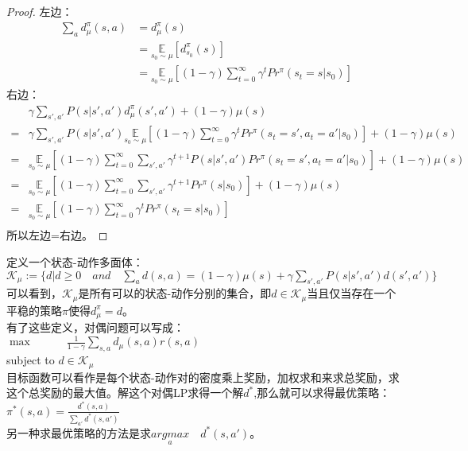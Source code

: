\begin{proof}
    左边：\\
    \begin{equation}
        \begin{aligned}
            \underset{a}{\sum}d^{\pi}_{\mu}(s,a)&=d^{\pi}_{\mu}(s)\\
           &=\underset{s_0\sim \mu}{\mathbb{E}}[d^{\pi}_{s_0}(s)]\\
           &=\underset{s_0\sim \mu}{\mathbb{E}}[(1-\gamma)\sum_{t=0}^{\infty}\gamma^tPr^{\pi}(s_t=s|s_0)]
        \end{aligned}
    \end{equation}
    右边：
    \begin{equation}
        \begin{aligned}
            &\gamma\underset{s',a'}{\sum}P(s|s',a')d^{\pi}_{\mu}(s',a')+(1-\gamma)\mu(s)\\
            =&\gamma\underset{s',a'}{\sum}P(s|s',a')\underset{s_0\sim \mu}{\mathbb{E}}[(1-\gamma)\sum_{t=0}^{\infty}\gamma^tPr^{\pi}(s_t=s',a_t=a'|s_0)]+(1-\gamma)\mu(s)\\
            =&\underset{s_0\sim \mu}{\mathbb{E}}[(1-\gamma)\sum_{t=0}^{\infty}\sum_{s',a'}\gamma^{t+1}P(s|s',a')Pr^{\pi}(s_t=s',a_t=a'|s_0)]+(1-\gamma)\mu(s)\\
            =&\underset{s_0\sim \mu}{\mathbb{E}}[(1-\gamma)\sum_{t=0}^{\infty}\sum_{s',a'}\gamma^{t+1}Pr^{\pi}(s|s_0)]+(1-\gamma)\mu(s)\\
            =&\underset{s_0\sim \mu}{\mathbb{E}}[(1-\gamma)\sum_{t=0}^{\infty}\gamma^tPr^{\pi}(s_t=s|s_0)]\\
        \end{aligned}
    \end{equation}
    所以左边=右边。
\end{proof}
定义一个状态-动作多面体：\\
$\mathcal{K}_\mu :=\{d|d\geq 0\quad and \quad \sum_a d(s,a)=(1-\gamma)\mu (s)+\gamma\sum_{s',a'}P(s|s',a')d(s',a')\}$\\
可以看到，$\mathcal{K} _\mu$是所有可以的状态-动作分别的集合，即$d\in\mathcal{K} _\mu$当且仅当存在一个平稳的策略$\pi$使得$d^{\pi}_{\mu}=d$。\\
有了这些定义，对偶问题可以写成：\\
$\max\qquad\quad \frac{1}{1-\gamma}\sum_{s,a}d_\mu(s,a)r(s,a) $\\
subject to  $d\in \mathcal{K}_{\mu}$\\
目标函数可以看作是每个状态-动作对的密度乘上奖励，加权求和来求总奖励，求这个总奖励的最大值。解这个对偶LP求得一个解$d^*$,那么就可以求得最优策略：\\
$\pi^*(s,a)=\frac{d^*(s,a)}{\sum_{a'}d^*(s,a')}$\\
另一种求最优策略的方法是求$\underset{a}{argmax}\quad d^*(s,a')$。